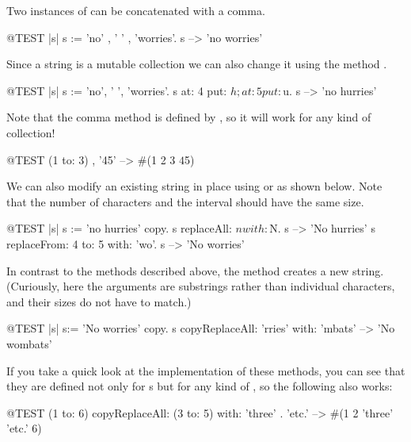 \documentclass[a4paper,10pt,twoside]{book}
\begin{document}
Two instances of  can be concatenated with a comma.
\begin{code}{@TEST |s|}
s := 'no' , ' ' , 'worries'.
s -->  'no worries'
\end{code}

Since a string is a mutable collection we can also change it using the method .

\begin{code}{@TEST |s| s := 'no', ' ', 'worries'.}
s at: 4 put: $h; at: 5 put: $u.
s --> 'no hurries'
\end{code}

Note that the comma method is defined by , so it will work for any kind of collection!
\begin{code}{@TEST}
(1 to: 3) , '45' --> #(1 2 3 $4 $5)
\end{code}

We can also modify an existing string in place using  or  as shown below. Note that the number of characters and the interval should have the same size.

\begin{code}{@TEST |s| s := 'no hurries' copy.}
s replaceAll: $n with: $N.
s --> 'No hurries'
s replaceFrom: 4 to: 5 with: 'wo'.
s --> 'No worries'
\end{code}

In contrast to the methods described above, the method  creates a new string.
(Curiously, here the arguments are substrings rather than individual characters, and their sizes do not have to match.)

\begin{code}{@TEST |s| s:= 'No worries' copy.}
s copyReplaceAll: 'rries' with: 'mbats' --> 'No wombats'
\end{code}

If you take a quick look at the implementation of these methods, you can see that they are defined not only for s but for any kind of , so the following also works:

\begin{code}{@TEST}
(1 to: 6) copyReplaceAll: (3 to: 5) with: {'three' . 'etc.'} --> #(1 2 'three' 'etc.' 6)
\end{code}
\end{document}
